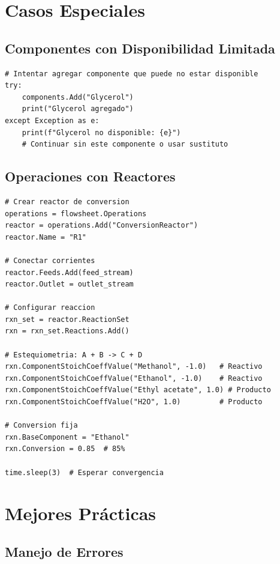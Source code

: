 \documentclass[12pt,a4paper]{article}
\begin{document}
\section{Casos Especiales}

\subsection{Componentes con Disponibilidad Limitada}

\begin{lstlisting}
# Intentar agregar componente que puede no estar disponible
try:
    components.Add("Glycerol")
    print("Glycerol agregado")
except Exception as e:
    print(f"Glycerol no disponible: {e}")
    # Continuar sin este componente o usar sustituto
\end{lstlisting}

\subsection{Operaciones con Reactores}

\begin{lstlisting}
# Crear reactor de conversion
operations = flowsheet.Operations
reactor = operations.Add("ConversionReactor")
reactor.Name = "R1"

# Conectar corrientes
reactor.Feeds.Add(feed_stream)
reactor.Outlet = outlet_stream

# Configurar reaccion
rxn_set = reactor.ReactionSet
rxn = rxn_set.Reactions.Add()

# Estequiometria: A + B -> C + D
rxn.ComponentStoichCoeffValue("Methanol", -1.0)   # Reactivo
rxn.ComponentStoichCoeffValue("Ethanol", -1.0)    # Reactivo
rxn.ComponentStoichCoeffValue("Ethyl acetate", 1.0) # Producto
rxn.ComponentStoichCoeffValue("H2O", 1.0)         # Producto

# Conversion fija
rxn.BaseComponent = "Ethanol"
rxn.Conversion = 0.85  # 85%

time.sleep(3)  # Esperar convergencia
\end{lstlisting}

\section{Mejores Prácticas}

\subsection{Manejo de Errores}
\end{document}
